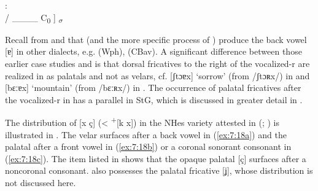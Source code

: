 \ea%
\label{ex:7:17}:\smallskip\\
 / \_\_\_\_ C\textsubscript{0} ] \textsubscript{${\sigma}$}
\z 

Recall from  and  that  (and the more specific process of ) produce the back vowel [ɐ] in other dialects, e.g.  (Wph),  (CBav). A significant difference between those earlier case studies and  is that dorsal fricatives to the right of the vocalized-r are realized in  as palatals and not as velars, cf. [ʃtɔɐx] ‘sorrow’ (from /ʃtɔʀx/) in  and [bɛːɐx] ‘mountain’ (from /bɛːʀx/) in . The occurrence of palatal fricatives after the vocalized-r in  has a parallel in StG, which is discussed in greater detail in .

The distribution of [x ç] (<  \textsuperscript{+}[k x]) in the NHes variety attested in  (\citealt{Corell1936}; ) is illustrated in . The velar surfaces after a back vowel in (\ref{ex:7:18a}) and the palatal after a front vowel in (\ref{ex:7:18b}) or a coronal sonorant consonant in (\ref{ex:7:18c}). The item listed in  shows that the opaque palatal [ç] surfaces after a noncoronal consonant.  also possesses the palatal fricative [ʝ], whose distribution is not discussed here.

